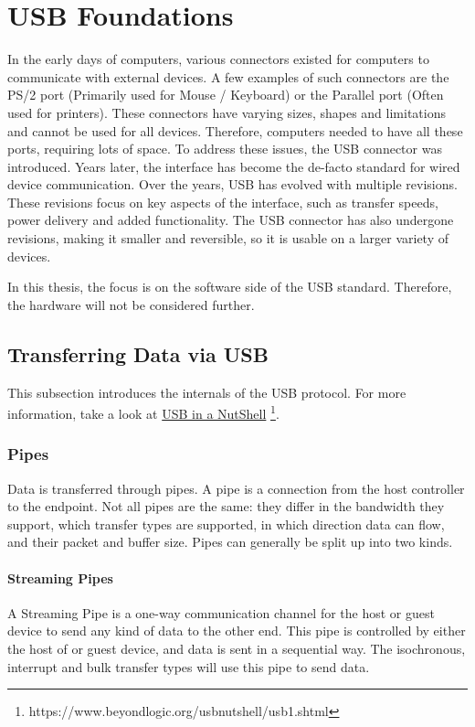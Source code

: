 \chapter{USB Foundations}
\label{chap:rel_work}
In the early days of computers, various connectors existed for computers to communicate with external devices. A few examples of such connectors are the PS/2 port (Primarily used for Mouse / Keyboard) or the Parallel port (Often used for printers). These connectors have varying sizes, shapes and limitations and cannot be used for all devices. Therefore, computers needed to have all these ports, requiring lots of space. To address these issues, the USB connector was introduced. Years later, the interface has become the de-facto standard for wired device communication. Over the years, USB has evolved with multiple revisions. These revisions focus on key aspects of the interface, such as transfer speeds, power delivery and added functionality. The USB connector has also undergone revisions, making it smaller and reversible, so it is usable on a larger variety of devices.

In this thesis, the focus is on the software side of the USB standard. Therefore, the hardware will not be considered further.

\section{Transferring Data via USB}

This subsection introduces the internals of the USB protocol. For more information, take a look at \href{https://www.beyondlogic.org/usbnutshell/usb1.shtml}{USB in a NutShell} \footnote{https://www.beyondlogic.org/usbnutshell/usb1.shtml}.
\subsection{Pipes}
Data is transferred through pipes. A pipe is a connection from the host controller to the endpoint. Not all pipes are the same: they differ in the bandwidth they support, which transfer types are supported, in which direction data can flow, and their packet and buffer size. Pipes can generally be split up into two kinds.

\subsubsection{Streaming Pipes}
A Streaming Pipe is a one-way communication channel for the host or guest device to send any kind of data to the other end. This pipe is controlled by either the host of or guest device, and data is sent in a sequential way. The isochronous, interrupt and bulk transfer types will use this pipe to send data.

